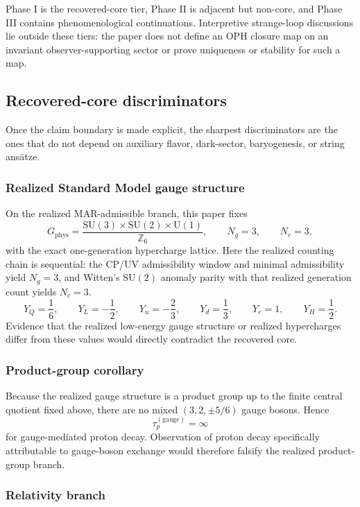 \documentclass[11pt]{article}
\newcommand{\SU}{\mathrm{SU}}
\newcommand{\U}{\mathrm{U}}
\begin{document}
Phase I is the recovered-core tier, Phase II is adjacent but non-core, and Phase III contains phenomenological continuations. Interpretive strange-loop discussions lie outside these tiers: the paper does not define an OPH closure map on an invariant observer-supporting sector or prove uniqueness or stability for such a map.

\subsection{Recovered-core discriminators}

Once the claim boundary is made explicit, the sharpest discriminators are the ones that do not depend on auxiliary flavor, dark-sector, baryogenesis, or string ans\"atze.

\subsubsection{Realized Standard Model gauge structure}

On the realized MAR-admissible branch, this paper fixes
\[
G_{\mathrm{phys}}=
\frac{\SU(3)\times\SU(2)\times\U(1)}{\mathbb Z_6},
\qquad
N_g=3,
\qquad
N_c=3,
\]
with the exact one-generation hypercharge lattice. Here the realized counting chain is sequential: the CP/UV admissibility window and minimal admissibility yield \(N_g=3\), and Witten's \(\SU(2)\) anomaly parity with that realized generation count yields \(N_c=3\).
\[
Y_Q=\frac16,\qquad
Y_L=-\frac12,\qquad
Y_u=-\frac23,\qquad
Y_d=\frac13,\qquad
Y_e=1,\qquad
Y_H=\frac12.
\]
Evidence that the realized low-energy gauge structure or realized hypercharges differ from these values would directly contradict the recovered core.

\subsubsection{Product-group corollary}

Because the realized gauge structure is a product group up to the finite central quotient fixed above, there are no mixed \((3,2,\pm 5/6)\) gauge bosons. Hence
\[
\tau_p^{(\mathrm{gauge})}=\infty
\]
for gauge-mediated proton decay. Observation of proton decay specifically attributable to gauge-boson exchange would therefore falsify the realized product-group branch.

\subsubsection{Relativity branch}
\end{document}
